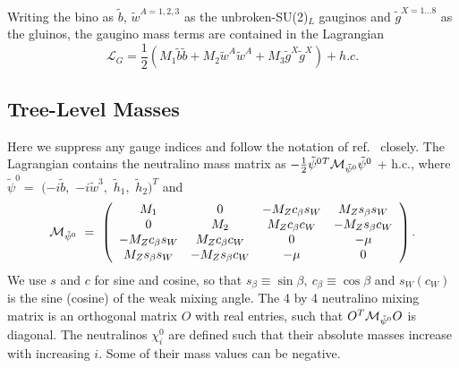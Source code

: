 \documentclass{article}
\begin{document}
Writing the bino as ${\tilde b}$, ${\tilde w}^{A=1,2,3}$ as the
unbroken-SU(2)$_L$ 
gauginos and ${\tilde 
g}^{X=1\ldots8}$ as the gluinos, the gaugino mass terms are contained in the
Lagrangian 
\begin{equation}
{\mathcal L}_G = \frac{1}{2} \left( M_1 {\tilde b}{\tilde b} + M_2 {\tilde w}^A{\tilde w}^A
+ M_3 {\tilde g}^X {\tilde g}^X \right) + h.c.
\end{equation}

\subsection{Tree-Level Masses \label{sec:tree}}
Here we suppress any gauge indices and follow the notation of
ref.~\cite{Pierce:1997zz} closely.
The Lagrangian contains the neutralino mass matrix as
$-\frac{1}{2}
{\tilde\psi^0}{}^T{\cal M}_{\tilde\psi^0}\tilde\psi^0$ + h.c., where
$\tilde\psi^0 =$ $(-i\tilde b,$ $-i\tilde w^3,$ $\tilde h_1,$ $\tilde
h_2)^T$ and
%
\begin{equation}
{\cal M}_{\tilde\psi^0} \ =\ \left(\begin{array}{cccc} M_1 & 0 &
-M_Zc_\beta s_W & M_Zs_\beta s_W \\ 0 & M_2 & M_Zc_\beta c_W &
-M_Zs_\beta c_W \\ -M_Zc_\beta s_W & M_Zc_\beta c_W & 0 & -\mu \\
M_Zs_\beta s_W & -M_Zs_\beta c_W & -\mu & 0
\end{array} \right). \label{mchi0}
\end{equation}
%
We use $s$ and $c$ for sine and cosine, so that
$s_\beta\equiv\sin\beta,\ c_{\beta}\equiv\cos\beta$ and $s_W (c_W)$ is
the sine (cosine) of the weak mixing angle.  
The 4 by 4 neutralino mixing matrix is an orthogonal matrix $O$ with real
entries, 
such that $O^T {\cal M}_{\tilde\psi^0} O$ is diagonal.
The neutralinos $\chi^0_i$ are defined such that their absolute masses
increase with increasing $i$.
Some of their mass values can be negative. 
\end{document}
